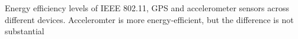 Energy efficiency levels of IEEE 802.11, GPS and accelerometer sensors across different devices. Acceleromter is more energy-efficient, but the difference is not substantial
